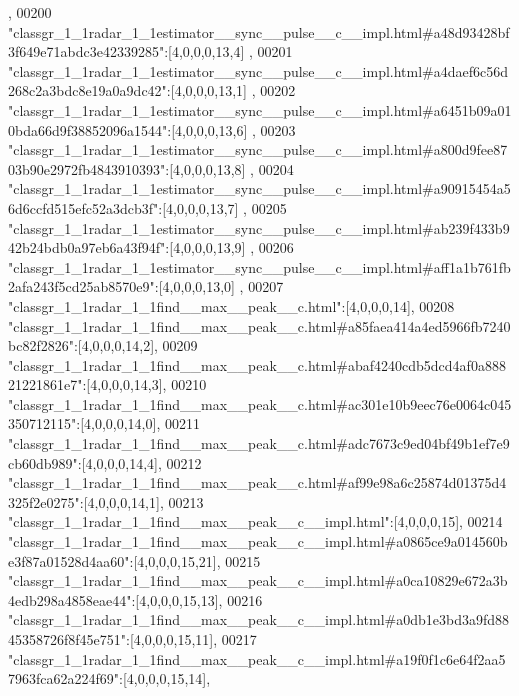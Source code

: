 \begin{DoxyCode}
      ,
00200 \textcolor{stringliteral}{"classgr\_1\_1radar\_1\_1estimator\_\_sync\_\_pulse\_\_c\_\_impl.html#a48d93428bf3f649e71abdc3e42339285"}:[4,0,0,0,13,4]
      ,
00201 \textcolor{stringliteral}{"classgr\_1\_1radar\_1\_1estimator\_\_sync\_\_pulse\_\_c\_\_impl.html#a4daef6c56d268c2a3bdc8e19a0a9dc42"}:[4,0,0,0,13,1]
      ,
00202 \textcolor{stringliteral}{"classgr\_1\_1radar\_1\_1estimator\_\_sync\_\_pulse\_\_c\_\_impl.html#a6451b09a010bda66d9f38852096a1544"}:[4,0,0,0,13,6]
      ,
00203 \textcolor{stringliteral}{"classgr\_1\_1radar\_1\_1estimator\_\_sync\_\_pulse\_\_c\_\_impl.html#a800d9fee8703b90e2972fb4843910393"}:[4,0,0,0,13,8]
      ,
00204 \textcolor{stringliteral}{"classgr\_1\_1radar\_1\_1estimator\_\_sync\_\_pulse\_\_c\_\_impl.html#a90915454a56d6ccfd515efc52a3dcb3f"}:[4,0,0,0,13,7]
      ,
00205 \textcolor{stringliteral}{"classgr\_1\_1radar\_1\_1estimator\_\_sync\_\_pulse\_\_c\_\_impl.html#ab239f433b942b24bdb0a97eb6a43f94f"}:[4,0,0,0,13,9]
      ,
00206 \textcolor{stringliteral}{"classgr\_1\_1radar\_1\_1estimator\_\_sync\_\_pulse\_\_c\_\_impl.html#aff1a1b761fb2afa243f5cd25ab8570e9"}:[4,0,0,0,13,0]
      ,
00207 \textcolor{stringliteral}{"classgr\_1\_1radar\_1\_1find\_\_max\_\_peak\_\_c.html"}:[4,0,0,0,14],
00208 \textcolor{stringliteral}{"classgr\_1\_1radar\_1\_1find\_\_max\_\_peak\_\_c.html#a85faea414a4ed5966fb7240bc82f2826"}:[4,0,0,0,14,2],
00209 \textcolor{stringliteral}{"classgr\_1\_1radar\_1\_1find\_\_max\_\_peak\_\_c.html#abaf4240cdb5dcd4af0a88821221861e7"}:[4,0,0,0,14,3],
00210 \textcolor{stringliteral}{"classgr\_1\_1radar\_1\_1find\_\_max\_\_peak\_\_c.html#ac301e10b9eec76e0064c045350712115"}:[4,0,0,0,14,0],
00211 \textcolor{stringliteral}{"classgr\_1\_1radar\_1\_1find\_\_max\_\_peak\_\_c.html#adc7673c9ed04bf49b1ef7e9cb60db989"}:[4,0,0,0,14,4],
00212 \textcolor{stringliteral}{"classgr\_1\_1radar\_1\_1find\_\_max\_\_peak\_\_c.html#af99e98a6c25874d01375d4325f2e0275"}:[4,0,0,0,14,1],
00213 \textcolor{stringliteral}{"classgr\_1\_1radar\_1\_1find\_\_max\_\_peak\_\_c\_\_impl.html"}:[4,0,0,0,15],
00214 \textcolor{stringliteral}{"classgr\_1\_1radar\_1\_1find\_\_max\_\_peak\_\_c\_\_impl.html#a0865ce9a014560be3f87a01528d4aa60"}:[4,0,0,0,15,21],
00215 \textcolor{stringliteral}{"classgr\_1\_1radar\_1\_1find\_\_max\_\_peak\_\_c\_\_impl.html#a0ca10829e672a3b4edb298a4858eae44"}:[4,0,0,0,15,13],
00216 \textcolor{stringliteral}{"classgr\_1\_1radar\_1\_1find\_\_max\_\_peak\_\_c\_\_impl.html#a0db1e3bd3a9fd8845358726f8f45e751"}:[4,0,0,0,15,11],
00217 \textcolor{stringliteral}{"classgr\_1\_1radar\_1\_1find\_\_max\_\_peak\_\_c\_\_impl.html#a19f0f1c6e64f2aa57963fca62a224f69"}:[4,0,0,0,15,14],

\end{DoxyCode}
